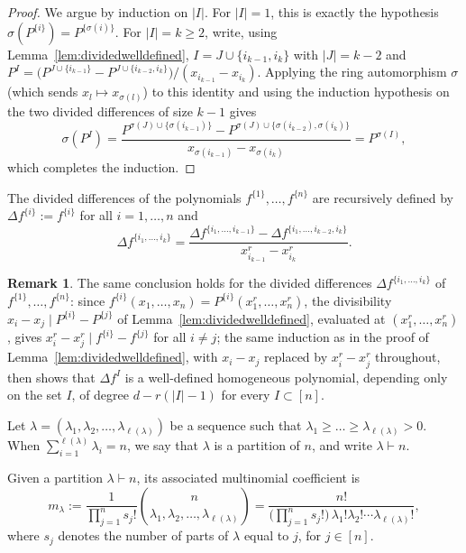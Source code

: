 \documentclass[12pt]{amsart}
\theoremstyle{definition}
\newtheorem{remark}[theorem]{Remark}
\DeclareMathOperator{\len}{\ell}
\begin{document}
\begin{proof}
We argue by induction on $|I|$. For $|I|=1$, this is exactly the hypothesis $\sigma(P^{\{i\}}) = P^{\{\sigma(i)\}}$. For $|I|=k \geqslant 2$, write, using Lemma~\ref{lem:dividedwelldefined}, $I = J \cup \{i_{k-1},i_k\}$ with $|J|=k-2$ and $P^I = \big(P^{J\cup\{i_{k-1}\}} - P^{J\cup\{i_{k-2},i_k\}}\big)/(x_{i_{k-1}}-x_{i_k})$. Applying the ring automorphism $\sigma$ (which sends $x_l \mapsto x_{\sigma(l)}$) to this identity and using the induction hypothesis on the two divided differences of size $k-1$ gives
\[
\sigma(P^I) = \frac{P^{\sigma(J)\cup\{\sigma(i_{k-1})\}} - P^{\sigma(J)\cup\{\sigma(i_{k-2}),\sigma(i_k)\}}}{x_{\sigma(i_{k-1})} - x_{\sigma(i_k)}} = P^{\sigma(I)},
\]
which completes the induction.
\end{proof}

The divided differences of the polynomials $f^{\{1\}},\dots,f^{\{n\}}$ are recursively defined by $\Delta f^{\{i\}} := f^{\{i\}}$ for all $i=1,\dots,n$ and
\begin{equation}
\label{eq:deltadef}
\Delta f^{\{i_1,\dots,i_k\}} = \frac{\Delta f^{\{i_1,\dots,i_{k-1}\}} - \Delta f^{\{i_1,\dots,i_{k-2},i_k\}}}{x_{i_{k-1}}^r - x_{i_k}^r}.
\end{equation}

\begin{remark}
\label{rem:deltawelldefined}
The same conclusion holds for the divided differences $\Delta f^{\{i_1,\dots,i_k\}}$ of $f^{\{1\}},\dots,f^{\{n\}}$: since $f^{\{i\}}(x_1,\dots,x_n) = P^{\{i\}}(x_1^r,\dots,x_n^r)$, the divisibility $x_i - x_j \mid P^{\{i\}} - P^{\{j\}}$ of Lemma~\ref{lem:dividedwelldefined}, evaluated at $(x_1^r,\dots,x_n^r)$, gives $x_i^r - x_j^r \mid f^{\{i\}} - f^{\{j\}}$ for all $i \ne j$; the same induction as in the proof of Lemma~\ref{lem:dividedwelldefined}, with $x_i - x_j$ replaced by $x_i^r - x_j^r$ throughout, then shows that $\Delta f^I$ is a well-defined homogeneous polynomial, depending only on the set $I$, of degree $d - r(|I|-1)$ for every $I \subset [n]$.
\end{remark}

Let $\lambda = (\lambda_1,\lambda_2,\dots,\lambda_{\len(\lambda)})$ be a sequence such that $\lambda_1 \geqslant \dots \geqslant \lambda_{\len(\lambda)} > 0$. When $\sum_{i=1}^{\len(\lambda)} \lambda_i = n$, we say that $\lambda$ is a partition of $n$, and write $\lambda \vdash n$.

Given a partition $\lambda \vdash n$, its associated multinomial coefficient is
\begin{equation}
\label{eq:multinom}
m_\lambda := \frac{1}{\prod_{j=1}^n s_j!} \binom{n}{\lambda_1,\lambda_2,\dots,\lambda_{\len(\lambda)}} = \frac{n!}{\big(\prod_{j=1}^n s_j!\big)\,\lambda_1!\lambda_2!\cdots \lambda_{\len(\lambda)}!},
\end{equation}
where $s_j$ denotes the number of parts of $\lambda$ equal to $j$, for $j \in [n]$.
\end{document}
